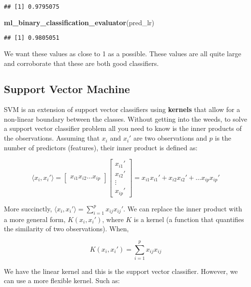 \documentclass[]{book}
\newenvironment{Shaded}{\begin{snugshade}}{\end{snugshade}}
\newcommand{\KeywordTok}[1]{\textcolor[rgb]{0.13,0.29,0.53}{\textbf{#1}}}
\newcommand{\NormalTok}[1]{#1}
\begin{document}
\begin{verbatim}
## [1] 0.9795075
\end{verbatim}

\begin{Shaded}
\begin{Highlighting}[]
\KeywordTok{ml_binary_classification_evaluator}\NormalTok{(pred_lr)}
\end{Highlighting}
\end{Shaded}

\begin{verbatim}
## [1] 0.9805051
\end{verbatim}

We want these values as close to 1 as a possible. These values are all quite large and corroborate that these are both good classifiers.

\hypertarget{support-vector-machine}{%
\subsection{Support Vector Machine}\label{support-vector-machine}}

SVM is an extension of support vector classifiers using \textbf{kernels} that allow for a non-linear boundary between the classes. Without getting into the weeds, to solve a support vector classifier problem all you need to know is the inner products of the observations. Assuming that \(x_i\) and \(x_i'\) are two observations and \(p\) is the number of predictors (features), their inner product is defined as:

\[
\langle x_i, x_i'\rangle = \begin{bmatrix} 
x_{i1} x_{i2} \dots x_{ip}
\end{bmatrix} 
\begin{bmatrix} 
x_{i1}' \\
x_{i2}' \\
\vdots \\
x_{ip}'
\end{bmatrix} = x_{i1}x_{i1}' + x_{i2}x_{i2}' + \dots x_{ip}x_{ip}'
\]

More succinctly, \(\langle x_i, x_i'\rangle = \sum_{i = 1}^p x_{ij}x_{ij}'\). We can replace the inner product with a more general form, \(K(x_i, x_i')\), where \(K\) is a kernel (a function that quantifies the similarity of two observations). When,

\[
K(x_i, x_i') = \sum_{i = 1}^p x_{ij}x_{ij}
\]

We have the linear kernel and this is the support vector classifier. However, we can use a more flexible kernel. Such as:
\end{document}
